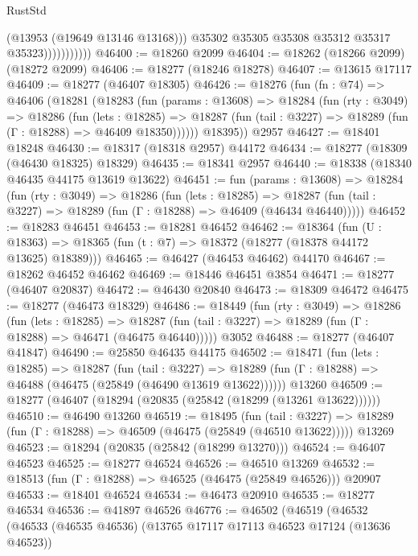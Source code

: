 \begin{lexlean}{RustStd}
\begin{coremodule}
                            (@13953 (@19649 @13146 @13168)))
                          @35302
                          @35305
                          @35308
                          @35312
                          @35317
                          @35323)))))))))))
@46400 := @18260 @2099
@46404 := @18262 (@18266 @2099) (@18272 @2099)
@46406 := @18277 (@18246 @18278)
@46407 := @13615 @17117
@46409 := @18277 (@46407 @18305)
@46426 := @18276
    (fun (fn : @74) =>
    @46406
      (@18281
        (@18283
          (fun (params : @13608) =>
          @18284
            (fun (rty : @3049) =>
            @18286
              (fun (lets : @18285) =>
              @18287 (fun (tail : @3227) => @18289 (fun (Γ : @18288) => @46409 @18350))))))
        @18395))
    @2957
@46427 := @18401 @18248
@46430 := @18317 (@18318 @2957) @44172
@46434 := @18277 (@18309 (@46430 @18325) @18329)
@46435 := @18341 @2957
@46440 := @18338 (@18340 @46435 @44175 @13619 @13622)
@46451 := fun (params : @13608) =>
  @18284
    (fun (rty : @3049) =>
    @18286
      (fun (lets : @18285) =>
      @18287 (fun (tail : @3227) => @18289 (fun (Γ : @18288) => @46409 (@46434 @46440)))))
@46452 := @18283 @46451
@46453 := @18281 @46452
@46462 := @18364
    (fun (U : @18363) => @18365 (fun (t : @7) => @18372 (@18277 (@18378 @44172 @13625) @18389)))
@46465 := @46427 (@46453 @46462) @44170
@46467 := @18262 @46452 @46462
@46469 := @18446 @46451 @3854
@46471 := @18277 (@46407 @20837)
@46472 := @46430 @20840
@46473 := @18309 @46472
@46475 := @18277 (@46473 @18329)
@46486 := @18449
    (fun (rty : @3049) =>
    @18286
      (fun (lets : @18285) =>
      @18287 (fun (tail : @3227) => @18289 (fun (Γ : @18288) => @46471 (@46475 @46440)))))
    @3052
@46488 := @18277 (@46407 @41847)
@46490 := @25850 @46435 @44175
@46502 := @18471
    (fun (lets : @18285) =>
    @18287
      (fun (tail : @3227) =>
      @18289 (fun (Γ : @18288) => @46488 (@46475 (@25849 (@46490 @13619 @13622))))))
    @13260
@46509 := @18277 (@46407 (@18294 (@20835 (@25842 (@18299 (@13261 @13622))))))
@46510 := @46490 @13260
@46519 := @18495
    (fun (tail : @3227) => @18289 (fun (Γ : @18288) => @46509 (@46475 (@25849 (@46510 @13622)))))
    @13269
@46523 := @18294 (@20835 (@25842 (@18299 @13270)))
@46524 := @46407 @46523
@46525 := @18277 @46524
@46526 := @46510 @13269
@46532 := @18513 (fun (Γ : @18288) => @46525 (@46475 (@25849 @46526))) @20907
@46533 := @18401 @46524
@46534 := @46473 @20910
@46535 := @18277 @46534
@46536 := @41897 @46526
@46776 := @46502
    (@46519
      (@46532
        (@46533
          (@46535 @46536)
          (@13765 @17117 @17113 @46523 @17124 (@13636 @46523))

\end{coremodule}
\end{lexlean}
